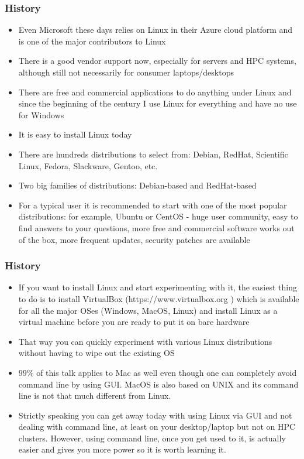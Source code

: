 \documentclass{beamer}
\begin{document}
\begin{frame}[fragile]
  \frametitle{History}
  \begin{itemize}
  \item Even Microsoft these days relies on Linux in their Azure cloud platform and is one of the major contributors to Linux
  \item There is a good vendor support now, especially for servers and HPC systems, although still not necessarily for consumer laptops/desktops
  \item There are free and commercial applications to do anything under Linux and since the beginning of the century I use Linux for everything and have no use for Windows
  \item It is easy to install Linux today
  \item There are hundreds distributions to select from: Debian, RedHat, Scientific Linux, Fedora, Slackware, Gentoo, etc.
  \item Two big families of distributions: Debian-based and RedHat-based
  \item For a typical user it is recommended to start with one of the most popular distributions: for example, Ubuntu or CentOS - huge user community, easy to find answers to your questions, more free and commercial 
    software works out of the box, more frequent updates, security patches are available
  \end{itemize}
\end{frame}


\begin{frame}[fragile]
  \frametitle{History}
  \begin{itemize}
  \item If you want to install Linux and start experimenting with it, the easiest thing to do is to install VirtualBox (https://www.virtualbox.org ) 
    which is available for all the major OSes (Windows, MacOS, Linux) and install Linux as a virtual machine before you are ready to put it on bare hardware
  \item That way you can quickly experiment with various Linux distributions without having to wipe out the existing OS
  \item $99\%$ of this talk applies to Mac as well even though one can completely avoid command line by using GUI. MacOS is also based on UNIX and its command line is not that much different from Linux.
  \item Strictly speaking you can get away today with using Linux via GUI and not dealing with command line, at least on your desktop/laptop but not on HPC clusters. However, using command line, once you get used to it,
    is actually easier and gives you more power so it is worth learning it.
\end{itemize}
\end{frame}
\end{document}
